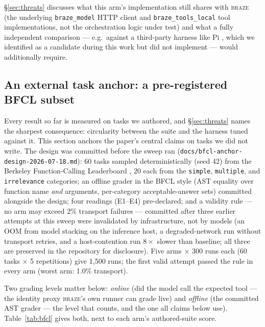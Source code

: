 \documentclass[smallcondensed,natbib]{svjour3}
\newcommand{\braze}{\textsc{braze}}
\begin{document}
\S\ref{sec:threats} discusses what this arm's implementation still
shares with \braze{} (the underlying \texttt{braze\_model} HTTP client
and \texttt{braze\_tools\_local} tool implementations, not the
orchestration logic under test) and what a fully independent comparison
--- e.g.\ against a third-party harness like Pi \citep{pi-dev}, which we
identified as a candidate during this work but did not implement ---
would additionally require.

\subsection{An external task anchor: a pre-registered BFCL
subset}\label{sec:bfcl}

Every result so far is measured on tasks we authored, and
\S\ref{sec:threats} names the sharpest consequence: circularity
between the suite and the harness tuned against it. This section
anchors the paper's central claims on tasks we did not write. The
design was committed before the sweep ran
(\texttt{docs/bfcl-anchor-design-2026-07-18.md}): 60 tasks sampled
deterministically (seed 42) from the Berkeley Function-Calling
Leaderboard \citep{bfcl}, 20 each from the \texttt{simple},
\texttt{multiple}, and \texttt{irrelevance} categories; an offline
grader in the BFCL style (AST equality over function name \emph{and}
arguments, per-category acceptable-answer sets) committed alongside
the design; four readings (E1--E4) pre-declared; and a validity rule
--- no arm may exceed 2\% transport failures --- committed after
three earlier attempts at this sweep were invalidated by
infrastructure, not by models (an OOM from model stacking on the
inference host, a degraded-network run without transport retries,
and a host-contention run $8\times$ slower than baseline; all three
are preserved in the repository for disclosure). Five arms
$\times$ 300 runs each (60 tasks $\times$ 5 repetitions) give 1{,}500
runs; the first valid attempt passed the rule in every arm (worst
arm: 1.0\% transport).

Two grading levels matter below: \emph{online} (did the model call
the expected tool --- the identity proxy \braze{}'s own runner can
grade live) and \emph{offline} (the committed AST grader --- the
level that counts, and the one all claims below use).
Table~\ref{tab:bfcl} gives both, next to each arm's authored-suite
score.
\end{document}
